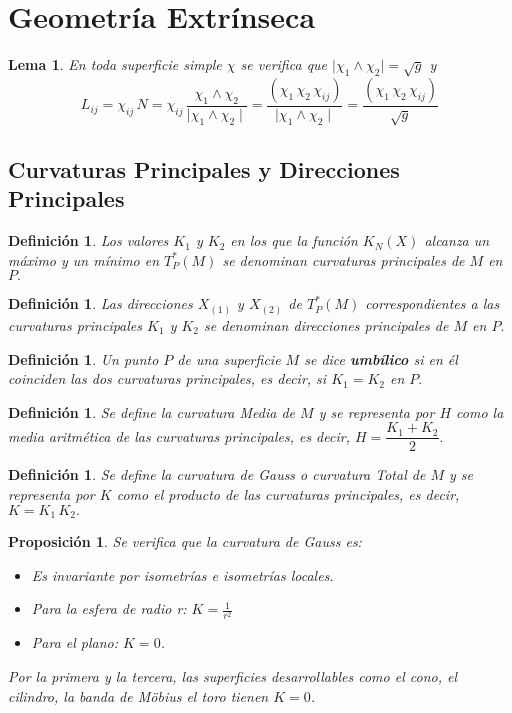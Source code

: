 \documentclass[twoside]{article}
\newtheorem{defi}[theorem]{Definición}
\newtheorem{lemma}[theorem]{Lema}
\newtheorem{prop}[theorem]{Proposición}
\numberwithin{equation}{section}
\begin{document}
\section{Geometría Extrínseca}

\begin{lemma}

En toda superficie simple $\chi$ se verifica que $ \mid \chi_1
\wedge \chi_2 \mid = \sqrt{g}$ y 
$$L_{ij}  = \chi_{ij} \, N = \chi_{ij} \,
\frac{\chi_1 \wedge \chi_2}{\mid \chi_1 \wedge \chi_2  \mid} =
\frac{(\chi_1 \,  \chi_2 \, \chi_{ij})}{\mid \chi_1 \wedge \chi_2
\mid} = \frac{(\chi_1 \,  \chi_2 \, \chi_{ij})}{\sqrt{g}}$$
\end{lemma}

\subsection{Curvaturas Principales y Direcciones Principales}

\begin{defi} Los valores $K_1$ y $K_2$ en los que la función $K_N(X)$ alcanza un máximo y un mínimo en $T_P^*(M)$ se denominan {\em curvaturas principales} de $M$ en $P.$
\end{defi}

\begin{defi} Las direcciones $X_{(1)}$ y $X_{(2)}$ de $T_P^*(M)$ correspondientes a las curvaturas principales $K_1$ y $K_2$ se denominan {\em direcciones principales} de $M$ en $P.$
\end{defi}

\begin{defi}
Un punto $P$ de una superficie $M$ se dice {\textbf{umbílico}} si en él
coinciden las dos curvaturas principales, es decir, si $K_1 = K_2$
en $P.$
\end{defi}

\begin{defi}
Se define la {\em curvatura Media} de $M$ y se representa por $H$
como la media aritmética de las curvaturas principales, es decir,
$H = \dfrac{K_1 + K_2}{2}.$
\end{defi}

\begin{defi}
Se define la {\em curvatura de Gauss o curvatura Total} de $M$ y
se representa por $K$ como el producto de las curvaturas
principales, es decir,  $K = K_1 \, K_2.$
\end{defi}
\begin{prop}
Se verifica que la curvatura de Gauss es:
\begin{itemize}
\item Es invariante por isometrías e isometrías locales.
\item Para la esfera de radio r: $K=\frac{1}{r^2}$
\item Para el plano: $K=0$.
\end{itemize}
Por la primera y la tercera, las superficies desarrollables como el cono, el cilindro, la banda de Möbius el toro tienen $K=0$.
\end{prop}
\end{document}
